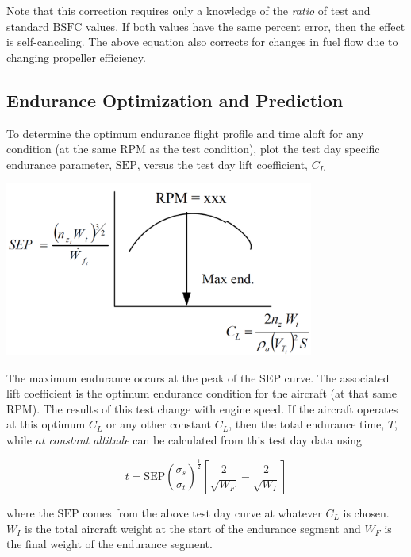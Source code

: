 \documentclass[
]{book}
\begin{document}
Note that this correction requires only a knowledge of the \emph{ratio} of test and
standard \(\mathrm{BSFC}\) values. If both values have the same percent error,
then the effect is self-canceling. The above equation also corrects for changes
in fuel flow due to changing propeller efficiency.

\hypertarget{endurance-optimization-and-prediction}{%
\subsection{Endurance Optimization and Prediction}\label{endurance-optimization-and-prediction}}

To determine the optimum endurance flight profile and time aloft for any
condition (at the same \(\mathrm{RPM}\) as the test condition), plot the test day
specific endurance parameter, \(\mathrm{SEP}\), versus the test day lift
coefficient, \(C_L\)

\includegraphics[width=4in,height=\textheight]{media/12/sep-c-sub-l-curve.png}

The maximum endurance occurs at the peak of the \(\mathrm{SEP}\) curve. The
associated lift coefficient is the optimum endurance condition for the aircraft
(at that same \(\mathrm{RPM}\)). The results of this test change with engine
speed. If the aircraft operates at this optimum \(C_L\) or any other constant
\(C_L\), then the total endurance time, \(T\), while \emph{at constant altitude} can
be calculated from this test day data using

\[
t = \mathrm{SEP} \left( \frac{\sigma_s}{\sigma_t} \right)^{\frac{1}{2}} \left[ \frac{2}{\sqrt{W_F}} - \frac{2}{\sqrt{W_I}} \right]
\label{eq:tot-endur-time}
\]

where the \(\mathrm{SEP}\) comes from the above test day curve at whatever
\(C_L\) is chosen. \(W_I\) is the total aircraft weight at the start of the
endurance segment and \(W_F\) is the final weight of the endurance segment.
\end{document}

